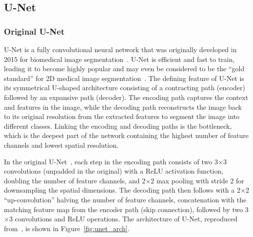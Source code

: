\subsection{U-Net}

\subsubsection{Original U-Net}

U-Net is a fully convolutional neural network that was originally developed in 2015 for biomedical image segmentation~\cite{Ronneberger_Fischer_Brox_2015}. U-Net is efficient and fast to train, leading it to become highly popular and may even be considered to be the \enquote{gold standard} for 2D medical image segmentation~\cite{Sengara_2022}. The defining feature of U-Net is its symmetrical U-shaped architecture consisting of a contracting path (encoder) followed by an expansive path (decoder). The encoding path captures the context and features in the image, while the decoding path reconstructs the image back to its original resolution from the extracted features to segment the image into different classes. Linking the encoding and decoding paths is the bottleneck, which is the deepest part of the network containing the highest number of feature channels and lowest spatial resolution.

In the original U-Net~\cite{Ronneberger_Fischer_Brox_2015}, each step in the encoding path consists of two 3$\times$3 convolutions (unpadded in the original) with a ReLU activation function, doubling the number of feature channels, and 2$\times$2 max pooling with stride 2 for downsampling the spatial dimensions. The decoding path then follows with a 2$\times$2 \enquote{up-convolution} halving the number of feature channels, concatenation with the matching feature map from the encoder path (skip connection), followed by two 3$\times$3 convolutions and ReLU operations. The architecture of U-Net, reproduced from~\cite{Ronneberger_Fischer_Brox_2015}, is shown in Figure~\ref{fig:unet_arch}.


